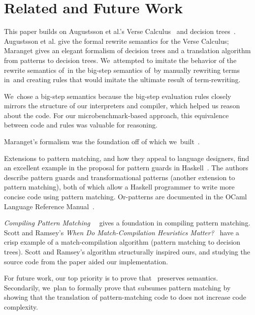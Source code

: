 \documentclass[runningheads]{llncs}
\begin{document}
    \section{Related and Future Work}

    This paper builds on Augustsson et al.'s Verse Calculus~\cite{verse} and
    decision trees~\cite{maranget}. %
    Augustsson et al. give the formal rewrite semantics for the Verse Calculus;
    Maranget gives an elegant formalism of decision trees and a translation
    algorithm from patterns to decision trees. %
    We~attempted to imitate the behavior of the rewrite semantics of~\VC in the
    big-step semantics of~\VMinus by manually rewriting terms in~\VC and
    creating rules that would imitate the ultimate result of term-rewriting. %
    
    We~chose a big-step semantics because the big-step evaluation rules closely
    mirrors the structure of our interpreters and compiler, which helped us
    reason about the code. For our microbenchmark-based approach, this equivalence 
    between code and rules was valuable for reasoning. %

    Maranget's formalism was the foundation off of which we~built~\D. %
    
    Extensions to pattern matching, and how they appeal to language designers,
    find an excellent example in the proposal for pattern guards in
    Haskell~\cite{guardproposal}. %
    The authors describe pattern guards and transformational patterns (another
    extension to pattern matching), both of which allow a Haskell programmer to
    write more concise code using pattern matching. %
    Or-patterns are documented in the OCaml Language Reference
    Manual~\cite{ocaml}. %
    
    \textit{Compiling Pattern Matching}~\cite{augustsson1985compiling}~ gives a
    foundation in compiling pattern matching. %
    Scott and Ramsey's \textit{When Do Match-Compilation Heuristics
    Matter?}~\cite{scottramsey} have a crisp example of a match-compilation
    algorithm (pattern matching to decision trees). %
    Scott and Ramsey's algorithm
    structurally inspired ours, and studying the source code from the paper
    aided our implementation. %

    For future work, our top priority is to prove that \DTran~preserves
    semantics. %
    Secondarily, we~plan to formally prove that \VMinus subsumes pattern
    matching by showing that the translation of pattern-matching code to \VMinus 
    does not increase code complexity. 
\end{document}
